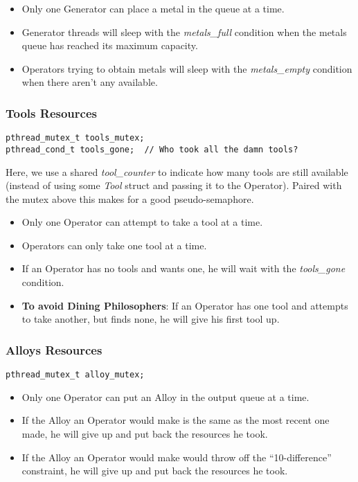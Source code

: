 \documentclass[titlepage]{article}
\begin{document}
\begin{itemize}
  \item Only one Generator can place a metal in the queue at a time.
  \item Generator threads will sleep with the \emph{metals\_full} condition
    when the metals queue has reached its maximum capacity.
  \item Operators trying to obtain metals will sleep with the
    \emph{metals\_empty} condition when there aren't any available.
\end{itemize}

\subsubsection{Tools Resources}
\begin{lstlisting}
pthread_mutex_t tools_mutex;
pthread_cond_t tools_gone;  // Who took all the damn tools?
\end{lstlisting}

Here, we use a shared \emph{tool\_counter} to indicate how many tools
are still available (instead of using some \emph{Tool} struct and passing
it to the Operator).
Paired with the mutex above this makes for a good pseudo-semaphore.

\begin{itemize}
  \item Only one Operator can attempt to take a tool at a time.
  \item Operators can only take one tool at a time.
  \item If an Operator has no tools and wants one, he will wait with
    the \emph{tools\_gone} condition.
  \item \textbf{To avoid Dining Philosophers}: If an Operator has one tool
    and attempts to take another, but finds none, he will give his
    first tool up.
\end{itemize}

\subsubsection{Alloys Resources}
\begin{lstlisting}
pthread_mutex_t alloy_mutex;
\end{lstlisting}

\begin{itemize}
  \item Only one Operator can put an Alloy in the output queue at a time.
  \item If the Alloy an Operator would make is the same as the most recent
    one made, he will give up and put back the resources he took.
  \item If the Alloy an Operator would make would throw off the
    ``10-difference'' constraint, he will give up and put back the resources
    he took.
\end{itemize}
\end{document}
